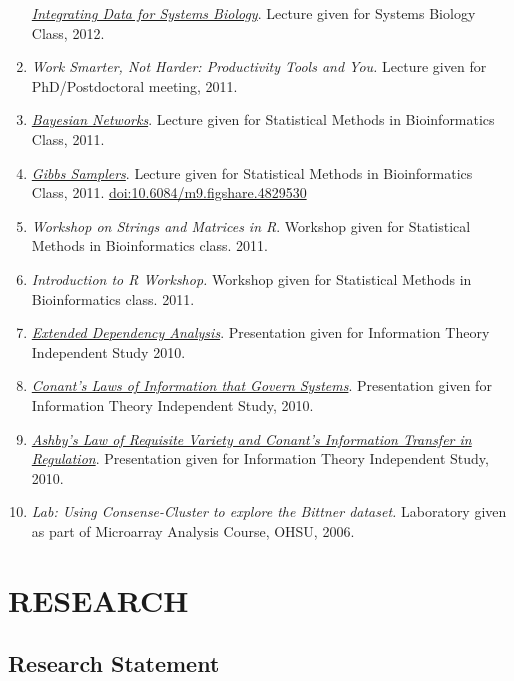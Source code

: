 \documentclass[11pt,]{article}
\begin{document}
\begin{enumerate}
  \href{https://www.dropbox.com/s/ksnogpxoh22eit8/IntegratingDataforSystemsBiology.pptx?dl=0}{\emph{Integrating
  Data for Systems Biology}}. Lecture given for Systems Biology Class,
  2012.
\item
  \emph{Work Smarter, Not Harder: Productivity Tools and You.} Lecture
  given for PhD/Postdoctoral meeting, 2011.
\item
  \href{https://www.dropbox.com/s/xab61u1jo9y9io9/bayesnets-new-laderas.pptx?dl=0}{\emph{Bayesian
  Networks}}. Lecture given for Statistical Methods in Bioinformatics
  Class, 2011.
\item
  \href{https://www.dropbox.com/s/r2j0oi1madn0t1s/GibbsSampler-laderas.pptx?dl=0}{\emph{Gibbs
  Samplers}}. Lecture given for Statistical Methods in Bioinformatics
  Class, 2011.
  \href{https://doi.org/10.6084/m9.figshare.4829530}{doi:10.6084/m9.figshare.4829530}
\item
  \emph{Workshop on Strings and Matrices in R}. Workshop given for
  Statistical Methods in Bioinformatics class. 2011.
\item
  \emph{Introduction to R Workshop.} Workshop given for Statistical
  Methods in Bioinformatics class. 2011.
\item
  \href{https://www.dropbox.com/s/yt8dybaap4sn8hy/03-eda-extended-dependency-analysis.pptx?dl=0}{\emph{Extended
  Dependency Analysis}}. Presentation given for Information Theory
  Independent Study 2010.
\item
  \href{https://www.dropbox.com/s/kkv4yv2vmwwdqfa/02-conant-laws-of-information.pptx?dl=0}{\emph{Conant's
  Laws of Information that Govern Systems}}. Presentation given for
  Information Theory Independent Study, 2010.
\item
  \href{https://www.dropbox.com/s/jz0gthjbd9cqbrt/01-ashby-conant-variety.pptx?dl=0}{\emph{Ashby's
  Law of Requisite Variety and Conant's Information Transfer in
  Regulation}}. Presentation given for Information Theory Independent
  Study, 2010.
\item
  \emph{Lab: Using Consense-Cluster to explore the Bittner dataset.}
  Laboratory given as part of Microarray Analysis Course, OHSU, 2006.
\end{enumerate}

\section{RESEARCH}\label{research}

\subsection{Research Statement}\label{research-statement}
\end{document}
